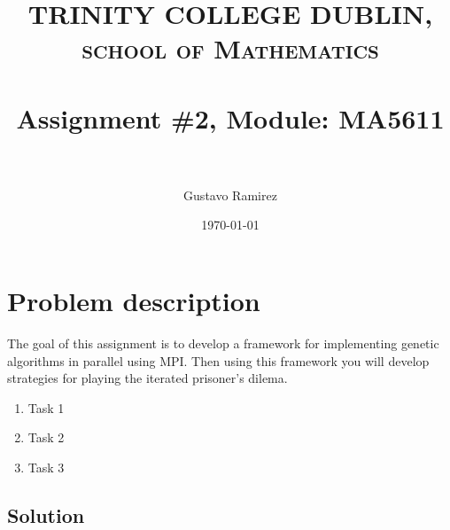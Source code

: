 \documentclass[paper=a4, fontsize=11pt]{scrartcl} %
\title{	
\normalfont \normalsize 
\textsc{TRINITY COLLEGE DUBLIN, school of Mathematics} \\ [25pt] %
\horrule{0.5pt} \\[0.4cm] %
\huge Assignment \#2, Module: MA5611 \\ %
\horrule{2pt} \\[0.5cm] %
}
\author{Gustavo Ramirez} %
\date{\normalsize\today} %
\numberwithin{equation}{section} %
\numberwithin{figure}{section} %
\numberwithin{table}{section} %
\begin{document}
\maketitle %


\section{Problem description}


The goal of this assignment is to develop a framework for implementing genetic algorithms in parallel using MPI. Then using this framework you will develop strategies for playing the iterated prisoner's dilema.


\begin{enumerate}


\item{Task 1}


\item{Task 2}


\item{Task 3}


\end{enumerate}

\newpage




\subsection{Solution}
\end{document}
